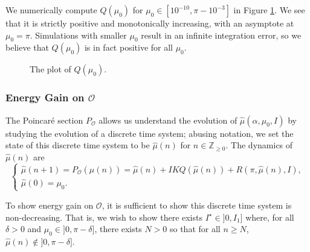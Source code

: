 We numerically compute \(Q(\mu_0)\) for \(\mu_0 \in [10^{-10}, \pi - 10^{-3}]\)
in Figure \ref{fig:acrobot-Q}. 
We see that it is strictly positive and monotonically increasing, with
an asymptote at \(\mu_0 = \pi\). 
Simulations with smaller \(\mu_0\) result in an infinite integration error,
so we believe that \(Q(\mu_0)\) is in fact positive for all \(\mu_0\).

\begin{figure}
    \centering
    \caption{The plot of \(Q(\mu_0)\).}
    \label{fig:acrobot-Q}
\end{figure}

\subsubsection*{Energy Gain on \(\mathcal{O}\)}

The Poincar\'{e} section \(P_\mathcal{O}\) allows us understand the evolution of
\(\hat{\mu}(\alpha,\mu_0,I)\) by studying the evolution of a discrete time system;
abusing notation, we set the state of this discrete time system to be
\(\hat{\mu}(n)\) for \(n \in \mathbb{Z}_{\geq 0}\). 
The dynamics of \(\hat{\mu}(n)\) are
\begin{equation}\label{eqn:muhat-discrete}
    \begin{cases}
        \hat{\mu}(n+1) = P_\mathcal{O}(\hat{\mu}(n)) 
        = \hat{\mu}(n) + I K Q(\hat{\mu}(n)) + R(\pi,\hat{\mu}(n),I)
        , \\
        \hat{\mu}(0) = \mu_0
        .
    \end{cases}
\end{equation}

To show energy gain on \(\mathcal{O}\), it is sufficient to 
show this discrete time system is non-decreasing.
That is, we wish to show there exists \(I^\star \in ]0, I_1]\) where, for all 
\(\delta > 0\) and \(\mu_0 \in ]0,\pi-\delta]\), there exists \(N > 0\) so that
for all \(n \geq N\), \(\hat{\mu}(n) \notin ]0,\pi-\delta]\).

